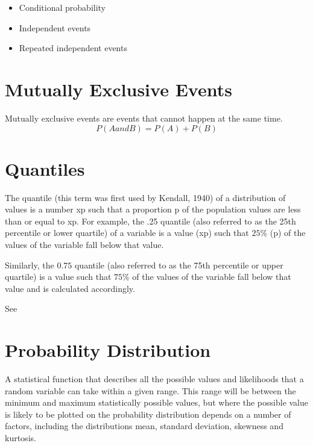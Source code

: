 \documentclass[12pt]{report}
\begin{document}
\begin{itemize}
	\item Conditional probability
	\item Independent events
	\item Repeated independent events
\end{itemize}


\section{Mutually Exclusive Events}
Mutually exclusive events are events that cannot happen at the same time.
\[ P(A and B) = P(A) + P(B) \]

\section{Quantiles}

The quantile (this term was first used by Kendall, 1940) of a distribution of values is a number xp such that a proportion p of the population values are less than or equal to xp. For example, the .25 quantile (also referred to as the 25th percentile or lower quartile) of a variable is a value (xp) such that $25\%$ (p) of the values of the variable fall below that value.

Similarly, the $0.75$ quantile (also referred to as the 75th percentile or upper quartile) is a value such that $75\%$ of the values of the variable fall below that value and is calculated accordingly.

See



\section{Probability Distribution}

A statistical function that describes all the possible values and likelihoods that a random variable can take within a given range. This range will be between the minimum and maximum statistically possible values, but where the possible value is likely to be plotted on the probability distribution depends on a number of factors, including the distributions mean, standard deviation, skewness and kurtosis.
\end{document}
